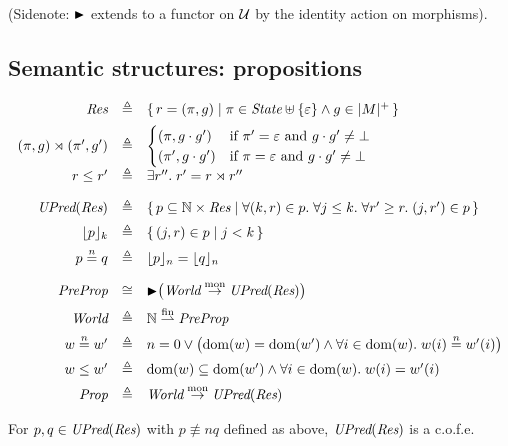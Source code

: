 (Sidenote: $\mathord{\blacktriangleright}$ extends to a functor on $\cal U$ by the identity
action on morphisms).


\subsection{Semantic structures: propositions}

\[
\begin{array}[t]{rcl}
\textdom{Res} &\eqdef&
\{\, \rs = (\pres, \ghostRes) \mid
\pres \in \textdom{State} \uplus \{\munit\} \land \ghostRes \in \mcarp{\monoid} \,\} \\[0.5em]
(\pres, \ghostRes) \rtimes
(\pres', \ghostRes') &\eqdef&
\begin{cases}
(\pres, \ghostRes \mtimes \ghostRes')  & \mbox{if $\pres' = \munit$ and $\ghostRes \mtimes \ghostRes' \neq \mzero$} \\
(\pres', \ghostRes \mtimes \ghostRes') & \mbox{if $\pres = \munit$ and $\ghostRes \mtimes \ghostRes' \neq \mzero$}
\end{cases}
\\[0.5em]
%
\rs \leq \rs' & \eqdef &
\Exists \rs''. \rs' = \rs \rtimes \rs''\\[1em]
%
\UPred(\textdom{Res}) &\eqdef& 
\{\, p \subseteq \mathbb{N} \times \textdom{Res} \mid
\All (k,\rs) \in p.
\All j\leq k.
\All \rs' \geq \rs.
(j,\rs')\in p \,\}\\[0.5em]
\restr{p}{k} &\eqdef& 
\{\, (j, \rs) \in p \mid j < k \,\}\\[0.5em]
p \nequiv{n} q & \eqdef & \restr{p}{n} = \restr{q}{n}\\[1em]
%
\textdom{PreProp} & \cong  &
\latert\big( \textdom{World} \monra \UPred(\textdom{Res})
\big)\\[0.5em]
%
\textdom{World} & \eqdef &
\mathbb{N} \fpfn \textdom{PreProp}\\[0.5em]
%
w \nequiv{n} w' & \eqdef & 
n = 0 \lor
\bigl(\dom(w) = \dom(w') \land \All i\in\dom(w). w(i) \nequiv{n} w'(i)\bigr)
\\[0.5em]
%
w \leq w' & \eqdef & 
\dom(w) \subseteq \dom(w') \land \All i \in \dom(w). w(i) = w'(i) 
\\[0.5em]
%
\textdom{Prop} & \eqdef & \textdom{World} \monra \UPred(\textdom{Res})
\end{array}
\]

For $p,q\in\textit{UPred}(\textit{Res})$ with $p \nequiv{n} q$ defined
as above, $\textit{UPred}(\textit{Res})$ is a 
c.o.f.e.

